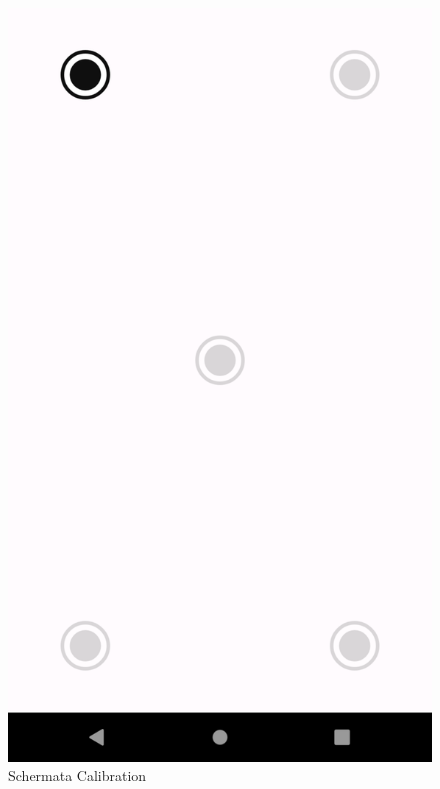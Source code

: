 \documentclass[11pt]{article}
\begin{document}
\begin{figure}[h]
\caption{Schermata Calibration }
\centering
\includegraphics[scale=0.2]{img/calibration.png}
\end{figure}


\newpage
\end{document}
